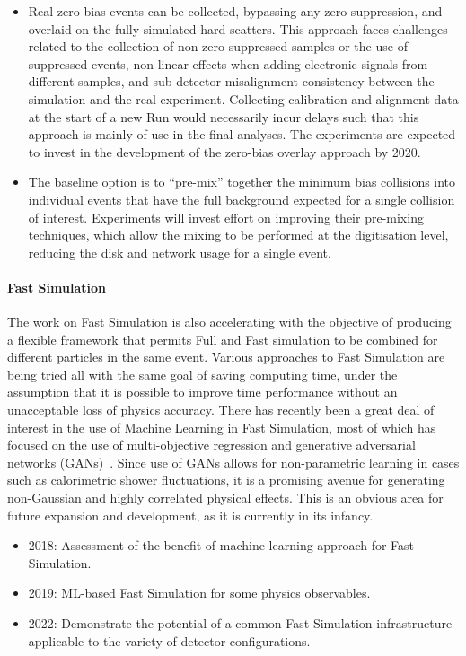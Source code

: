 \begin{itemize}
\item
  Real zero-bias events can be collected, bypassing any zero
  suppression, and overlaid on the fully simulated hard scatters. This
  approach faces challenges related to the collection of
  non-zero-suppressed samples or the use of suppressed events,
  non-linear effects when adding electronic signals from different
  samples, and sub-detector misalignment consistency between the
  simulation and the real experiment. Collecting calibration and
  alignment data at the start of a new Run would necessarily incur
  delays such that this approach is mainly of use in the final analyses.
  The experiments are expected to invest in the development of the
  zero-bias overlay approach by 2020.
\item
  The baseline option is to ``pre-mix'' together the minimum bias
  collisions into individual events that have the full background
  expected for a single collision of interest. Experiments will invest
  effort on improving their pre-mixing techniques, which allow the
  mixing to be performed at the digitisation level, reducing the disk and
  network usage for a single event.
\end{itemize}

\paragraph{Fast Simulation} The work on Fast Simulation is also
accelerating with the objective of producing a flexible framework that
permits Full and Fast simulation to be combined for different particles
in the same event. Various approaches to Fast Simulation are being tried
all with the same goal of saving computing time, under the assumption
that it is possible to improve time performance without an unacceptable
loss of physics accuracy. There has recently been a great deal of
interest in the use of Machine Learning in Fast Simulation, most of
which has focused on the use of multi-objective regression and
generative adversarial networks (GANs)~\cite{NIPS2014_5423}. Since use of GANs allows for
non-parametric learning in cases such as calorimetric shower
fluctuations, it is a promising avenue for generating non-Gaussian and
highly correlated physical effects. This is an obvious area for future
expansion and development, as it is currently in its infancy.

\begin{itemize}
\item
  2018: Assessment of the benefit of machine learning approach for Fast
  Simulation.
\item
  2019: ML-based Fast Simulation for some physics observables.
\item
  2022: Demonstrate the potential of a common Fast Simulation
  infrastructure applicable to the variety of detector configurations.
\end{itemize}

